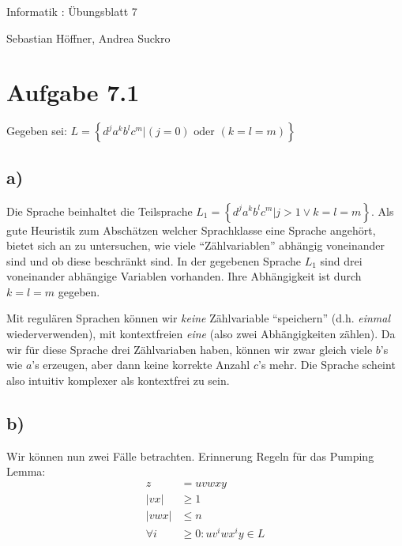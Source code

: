 \documentclass{article}
\begin{document}
\begin{center}
  \Large{Informatik \revD: Übungsblatt 7}

  \large{Sebastian Höffner, Andrea Suckro}
\end{center}



\section*{Aufgabe 7.1}
Gegeben sei: $L=\left\{d^ja^kb^lc^m | (j=0)\text{ oder }(k=l=m) \right\}$

\subsection*{a)}

Die Sprache beinhaltet die Teilsprache $L_1=\left\{d^ja^kb^lc^m | j>1 \vee k=l=m \right\}$. Als gute Heuristik zum Abschätzen welcher Sprachklasse eine Sprache angehört, bietet sich an zu untersuchen, wie viele "`Zählvariablen"' abhängig voneinander sind und ob diese beschränkt sind. In der gegebenen Sprache $L_1$ sind drei voneinander abhängige Variablen vorhanden. Ihre Abhängigkeit ist durch $k=l=m$ gegeben. 

Mit regulären Sprachen können wir \emph{keine} Zählvariable "`speichern"' (d.h. \emph{einmal} wiederverwenden), mit kontextfreien \emph{eine} (also zwei Abhängigkeiten zählen). Da wir für diese Sprache drei Zählvariaben haben, können wir zwar gleich viele $b$'s wie $a$'s erzeugen, aber dann keine korrekte Anzahl $c$'s mehr. Die Sprache scheint also intuitiv komplexer als kontextfrei zu sein.

\subsection*{b)}
Wir können nun zwei Fälle betrachten. Erinnerung Regeln für das Pumping Lemma:
\begin{align*}
z &= uvwxy \\
|vx| &\geq 1\\
|vwx| &\leq n \\
\forall i &\geq 0: uv^iwx^iy\in L 
\end{align*}
\end{document}
